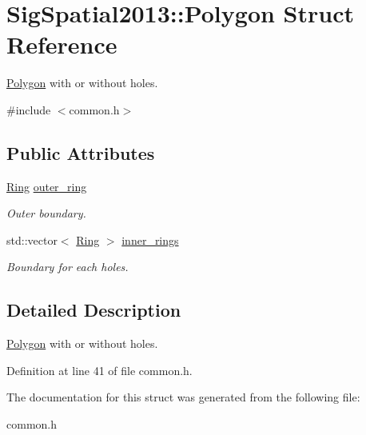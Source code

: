 \hypertarget{structSigSpatial2013_1_1Polygon}{\section{Sig\-Spatial2013\-:\-:Polygon Struct Reference}
\label{structSigSpatial2013_1_1Polygon}
}


\hyperlink{structSigSpatial2013_1_1Polygon}{Polygon} with or without holes.  




{\ttfamily \#include $<$common.\-h$>$}

\subsection*{Public Attributes}
\begin{DoxyCompactItemize}
\item 
\hypertarget{structSigSpatial2013_1_1Polygon_a3a998563c748b268a2148d87f6917378}{\hyperlink{structSigSpatial2013_1_1Ring}{Ring} \hyperlink{structSigSpatial2013_1_1Polygon_a3a998563c748b268a2148d87f6917378}{outer\-\_\-ring}}\label{structSigSpatial2013_1_1Polygon_a3a998563c748b268a2148d87f6917378}

\begin{DoxyCompactList}\small\item\em Outer boundary. \end{DoxyCompactList}\item 
\hypertarget{structSigSpatial2013_1_1Polygon_ac78207a99824ccf5571134a51658de9a}{std\-::vector$<$ \hyperlink{structSigSpatial2013_1_1Ring}{Ring} $>$ \hyperlink{structSigSpatial2013_1_1Polygon_ac78207a99824ccf5571134a51658de9a}{inner\-\_\-rings}}\label{structSigSpatial2013_1_1Polygon_ac78207a99824ccf5571134a51658de9a}

\begin{DoxyCompactList}\small\item\em Boundary for each holes. \end{DoxyCompactList}\end{DoxyCompactItemize}


\subsection{Detailed Description}
\hyperlink{structSigSpatial2013_1_1Polygon}{Polygon} with or without holes. 

Definition at line 41 of file common.\-h.



The documentation for this struct was generated from the following file\-:\begin{DoxyCompactItemize}
\item 
common.\-h\end{DoxyCompactItemize}
